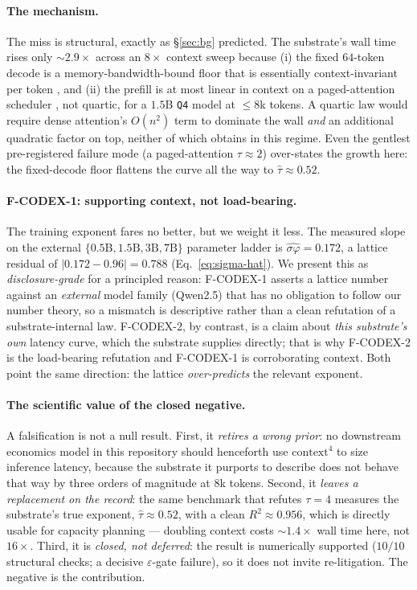 \documentclass[11pt,a4paper]{article}
\newcommand{\taum}{\ensuremath{\hat{\tau}}}
\begin{document}
\paragraph{The mechanism.}
The miss is structural, exactly as \S\ref{sec:bg} predicted. The substrate's
wall time rises only \(\sim\!2.9\times\) across an \(8\times\) context sweep
because (i) the fixed \(64\)-token decode is a memory-bandwidth-bound floor that
is essentially context-invariant per token \citep{pope2022efficiently}, and
(ii) the prefill is at most linear in context on a paged-attention scheduler
\citep{kwon2023vllm}, not quartic, for a \(1.5\)B \texttt{Q4} model at
\(\le\!8\)k tokens. A quartic law would require dense attention's \(O(n^2)\)
term to dominate the wall \emph{and} an additional quadratic factor on top,
neither of which obtains in this regime. Even the gentlest pre-registered
failure mode (a paged-attention \(\tau \approx 2\)) over-states the growth here:
the fixed-decode floor flattens the curve all the way to \(\taum \approx 0.52\).

\paragraph{F-CODEX-1: supporting context, not load-bearing.}
The training exponent fares no better, but we weight it less. The measured slope
on the external \(\{0.5\text{B}, 1.5\text{B}, 3\text{B}, 7\text{B}\}\) parameter
ladder is \(\hat{\sigma\varphi} = 0.172\), a lattice residual of
\(|0.172 - 0.96| = 0.788\) (Eq.~\eqref{eq:sigma-hat}). We present this as
\emph{disclosure-grade} for a principled reason: F-CODEX-1 asserts a lattice
number against an \emph{external} model family (Qwen2.5) that has no obligation
to follow our number theory, so a mismatch is descriptive rather than a clean
refutation of a substrate-internal law. F-CODEX-2, by contrast, is a claim about
\emph{this substrate's own} latency curve, which the substrate supplies
directly; that is why F-CODEX-2 is the load-bearing refutation and F-CODEX-1 is
corroborating context. Both point the same direction: the lattice
\emph{over-predicts} the relevant exponent.

\paragraph{The scientific value of the closed negative.}
A falsification is not a null result. First, it \emph{retires a wrong prior}: no
downstream economics model in this repository should henceforth use
\(\mathrm{context}^4\) to size inference latency, because the substrate it
purports to describe does not behave that way by three orders of magnitude at
\(8\)k tokens. Second, it \emph{leaves a replacement on the record}: the same
benchmark that refutes \(\tau = 4\) measures the substrate's true exponent,
\(\taum \approx 0.52\), with a clean \(R^2 \approx 0.956\), which is directly
usable for capacity planning --- doubling context costs \(\sim\!1.4\times\) wall
time here, not \(16\times\). Third, it is \emph{closed, not deferred}: the
result is numerically supported (\(10/10\) structural checks; a decisive
\(\varepsilon\)-gate failure), so it does not invite re-litigation. The negative
is the contribution.
\end{document}
